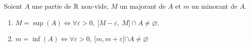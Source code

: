 \begin{proposition}
    Soient $A$ une partie de $\mathbb{R}$ non-vide, $M$ un majorant de $A$ et $m$ un minorant de $A$.  
    \begin{enumerate}
        \item $M = \sup(A) \iff \forall \varepsilon > 0,\ ]M - \varepsilon,\ M] \cap A \neq \varnothing$.
        \item $m = \inf(A) \iff \forall \varepsilon > 0,\ [m, m + \varepsilon[ \cap A \neq \varnothing $
    \end{enumerate}
\end{proposition}